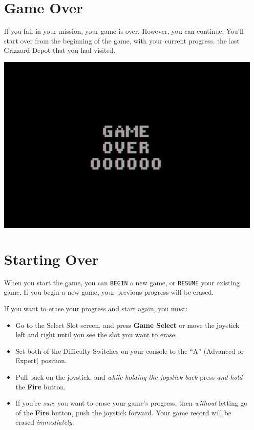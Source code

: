 \documentclass[10pt,twocolumn,openany,article]{memoir}
\begin{document}
\section{Game Over}

If  you fail  in  your mission,  your  game is  over.  However, you  can
continue. You'll start over from  \ifdefined\NOSAVE the beginning of the
game, with your current progress. \else the last Grizzard Depot that you
had visited. \fi

\begin{center}
  \includegraphics[width=\columnwidth]{../Manual/GameOverNTSC.png}
\end{center}

\section{Starting Over}\label{Starting Your Adventure Over}

\ifdefined\NOSAVE

When  you  start  the  game,  you can  \texttt{BEGIN}  a  new  game,  or
\texttt{RESUME}  your existing  game.  If  you begin  a  new game,  your
previous progress will be erased.

\else

If you want to erase your progress and start again, you must:

\begin{itemize}
\item Go  to the Select Slot  screen, and press \textbf{Game  Select} or
  move  the joystick  left and  right until  you see  the slot  you want
  to erase.
\item Set both  of the Difficulty Switches on your  console to the ``A''
  (Advanced or Expert) position.
\item Pull  back on the  joystick, and \emph{while holding  the joystick
    back} press \emph{and hold} the \textbf{Fire} button.
\item If you're \emph{sure} you want to erase your game's progress, then
  \emph{without}  letting  go  of  the \textbf{Fire}  button,  push  the
  joystick  forward. \ifdefined\DEMO  Your  game record  will be  erased
  \emph{immediately}. \fi
\end{itemize}
\end{document}
